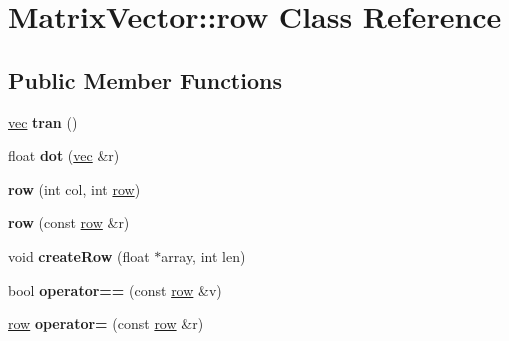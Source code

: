\hypertarget{class_matrix_vector_1_1row}{}\section{Matrix\+Vector\+:\+:row Class Reference}
\label{class_matrix_vector_1_1row}
\subsection*{Public Member Functions}
\begin{DoxyCompactItemize}
\item 
\mbox{\label{class_matrix_vector_1_1row_a811db3ee69813172bb193d301892d6c8}} 
\mbox{\hyperlink{class_matrix_vector_1_1vec}{vec}} {\bfseries tran} ()
\item 
\mbox{\label{class_matrix_vector_1_1row_a3a6cd508c032453418dd65c0ad7b2d29}} 
float {\bfseries dot} (\mbox{\hyperlink{class_matrix_vector_1_1vec}{vec}} \&r)
\item 
\mbox{\label{class_matrix_vector_1_1row_a8ee864b19f9e2f7272091f486d85f252}} 
{\bfseries row} (int col, int \mbox{\hyperlink{class_matrix_vector_1_1row}{row}})
\item 
\mbox{\label{class_matrix_vector_1_1row_ab1d7f626736a16cdc8d3670657c75213}} 
{\bfseries row} (const \mbox{\hyperlink{class_matrix_vector_1_1row}{row}} \&r)
\item 
\mbox{\label{class_matrix_vector_1_1row_a0a103a7fe75a43b4f2db2ce65f45caf5}} 
void {\bfseries create\+Row} (float $\ast$array, int len)
\item 
\mbox{\label{class_matrix_vector_1_1row_a1548f087a756261bb8dce854ef6d5528}} 
bool {\bfseries operator==} (const \mbox{\hyperlink{class_matrix_vector_1_1row}{row}} \&v)
\item 
\mbox{\label{class_matrix_vector_1_1row_a8ba978a55b253872f974ecc20b80027a}} 
\mbox{\hyperlink{class_matrix_vector_1_1row}{row}} {\bfseries operator=} (const \mbox{\hyperlink{class_matrix_vector_1_1row}{row}} \&r)
\item 

\end{DoxyCompactItemize}
